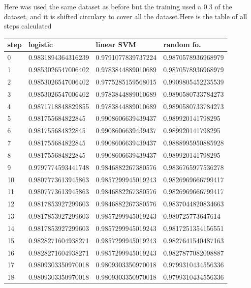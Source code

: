 Here was used the same dataset as before but the training used a 0.3 of the dataset, and it is shifted circulary to cover all the dataset.Here is the table of all steps calculated \\
\begin{longtable} 
{|l |l |l |l |} 
\hline 
step  &logistic  &linear SVM  &random fo.  \\ \hline
0  &0.9831894364316239  &0.9791077839737224  &0.9870578936968979  \\ \hline
1  &0.9853026547006402  &0.9783844889010689  &0.9870578936968979  \\ \hline
2  &0.9853026547006402  &0.9775285159568015  &0.9909805452235539  \\ \hline
3  &0.9853026547006402  &0.9783844889010689  &0.9890580733784273  \\ \hline
4  &0.9871718848829855  &0.9783844889010689  &0.9890580733784273  \\ \hline
5  &0.981755684822845  &0.9908606639439437  &0.989920141798295  \\ \hline
6  &0.981755684822845  &0.9908606639439437  &0.989920141798295  \\ \hline
7  &0.981755684822845  &0.9908606639439437  &0.9888995950885928  \\ \hline
8  &0.981755684822845  &0.9908606639439437  &0.989920141798295  \\ \hline
9  &0.9797774593441748  &0.9846882267380576  &0.9836765977536278  \\ \hline
10  &0.9807773613945863  &0.9857299945019243  &0.9826969666799417  \\ \hline
11  &0.9807773613945863  &0.9846882267380576  &0.9826969666799417  \\ \hline
12  &0.9817853927299603  &0.9846882267380576  &0.9837044820834663  \\ \hline
13  &0.9817853927299603  &0.9857299945019243  &0.980725773647614  \\ \hline
14  &0.9817853927299603  &0.9857299945019243  &0.9817251354156551  \\ \hline
15  &0.9828271604938271  &0.9857299945019243  &0.9827641540487163  \\ \hline
16  &0.9828271604938271  &0.9857299945019243  &0.9827877082098887  \\ \hline
17  &0.9809303350970018  &0.9809303350970018  &0.9799310434556336  \\ \hline
18  &0.9809303350970018  &0.9809303350970018  &0.9799310434556336  \\ \hline

\end{longtable}
